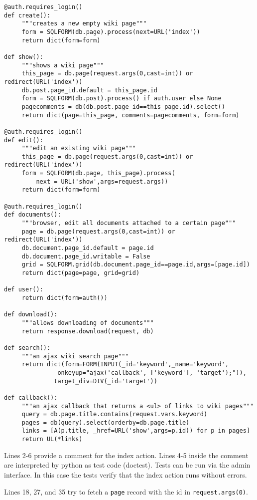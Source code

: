 \documentclass[justified,sixbynine,notoc]{tufte-book}
\def\ft{\small\tt}
\begin{document}
\begin{fullwidth}
\begin{lstlisting}
@auth.requires_login()
def create():
     """creates a new empty wiki page"""
     form = SQLFORM(db.page).process(next=URL('index'))
     return dict(form=form)

def show():
     """shows a wiki page"""
     this_page = db.page(request.args(0,cast=int)) or redirect(URL('index'))
     db.post.page_id.default = this_page.id
     form = SQLFORM(db.post).process() if auth.user else None
     pagecomments = db(db.post.page_id==this_page.id).select()
     return dict(page=this_page, comments=pagecomments, form=form)

@auth.requires_login()
def edit():
     """edit an existing wiki page"""
     this_page = db.page(request.args(0,cast=int)) or redirect(URL('index'))
     form = SQLFORM(db.page, this_page).process(
         next = URL('show',args=request.args))
     return dict(form=form)

@auth.requires_login()
def documents():
     """browser, edit all documents attached to a certain page"""
     page = db.page(request.args(0,cast=int)) or redirect(URL('index'))
     db.document.page_id.default = page.id
     db.document.page_id.writable = False
     grid = SQLFORM.grid(db.document.page_id==page.id,args=[page.id])
     return dict(page=page, grid=grid)

def user():
     return dict(form=auth())

def download():
     """allows downloading of documents"""
     return response.download(request, db)

def search():
     """an ajax wiki search page"""
     return dict(form=FORM(INPUT(_id='keyword',_name='keyword',
              _onkeyup="ajax('callback', ['keyword'], 'target');")),
              target_div=DIV(_id='target'))

def callback():
     """an ajax callback that returns a <ul> of links to wiki pages"""
     query = db.page.title.contains(request.vars.keyword)
     pages = db(query).select(orderby=db.page.title)
     links = [A(p.title, _href=URL('show',args=p.id)) for p in pages]
     return UL(*links)
\end{lstlisting}

Lines 2-6 provide a comment for the index action. Lines 4-5 inside the comment are interpreted by python as test code (doctest). Tests can be run via the admin interface. In this case the tests verify that the index action runs without errors.

Lines 18, 27, and 35 try to fetch a {\ft page} record with the id in
{\ft request.args(0)}.


\end{fullwidth}
\end{document}
